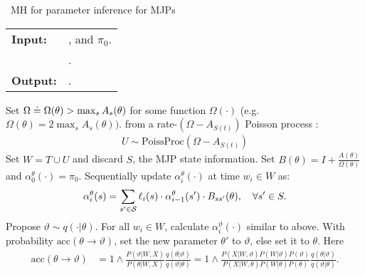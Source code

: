 \begin{algorithm}[H]
   \caption{\Naive\  MH for parameter inference for MJPs }
   \label{alg:MH_naive}
  \begin{tabular}{l l}
   \textbf{Input:  } & \text{Observations $X$}, 
                       \text{the MJP path $S(t) = (S, T)$, the  parameters $\theta$ }and $\pi_0$.\\ 
                     & \text{A  Metropolis-Hasting proposal $q(\cdot | \theta)$}.\\
   \textbf{Output:  }& \text{A new MJP trajectory $S'(t) = (S', T')$, 
                            new MJP parameters $\theta'$}.\\
   \hline
   \end{tabular}
   \begin{algorithmic}[1]
     \State Set $\Omega \doteq \Omega(\theta) > \max_s{A_s(\theta)}$ for
     some function $\Omega(\cdot)$ (e.g.\ $\Omega(\theta) = 
      2\max_s A_s(\theta))$.
       from a rate-$(\Omega-A_{S(t)})$ Poisson process : 
\begin{align*}
  U \sim \text{PoissProc}(\Omega - A_{S(t)}) 
\end{align*}
      \State 
    Set $W = T \cup U$ and discard $S$, the MJP state information.
    \State 
    Set $B(\theta) = I + \frac{A(\theta)}{\Omega(\theta)}$ and
    $\alpha^\theta_0(\cdot) = \pi_0$.
    Sequentially update $\alpha^\theta_i(\cdot)$ at time $w_i \in W$ as: 
    $$\alpha^{\theta}_i(s) = \sum_{s' \in {\mathcal S}} \ell_i(s) \cdot \alpha^{\theta}_{i-1}(s')\cdot B_{ss'}(\theta), \quad \forall s' \in S. $$
      \State Propose $\vartheta \sim q(\cdot| \theta)$.
      For all $w_i \in W$, calculate $\alpha^\vartheta_i(\cdot)$ similar to above.
      \State With probability $\text{acc}(\theta\rightarrow\vartheta)$, set the new parameter $\theta'$ to $\vartheta$, else set it to $\theta$. Here 
          \begin{align}
            \label{eq:ncp_acc}
            \text{acc}(\theta \rightarrow \vartheta) &=  1 \wedge \frac{P(\vartheta|W, X)}{P(\theta|W, X)} \frac{q(\theta|\vartheta)}{q(\vartheta|\theta)}
          =  1 \wedge \frac{P(X| W,\vartheta) P(W | \vartheta)P(\vartheta)}
            {P(X|W, \theta)P(W | \theta)P(\theta)} \frac{q(\theta|\vartheta)}{q(\vartheta|\theta)}.

\end{align}
\end{algorithmic}
\end{algorithm}

